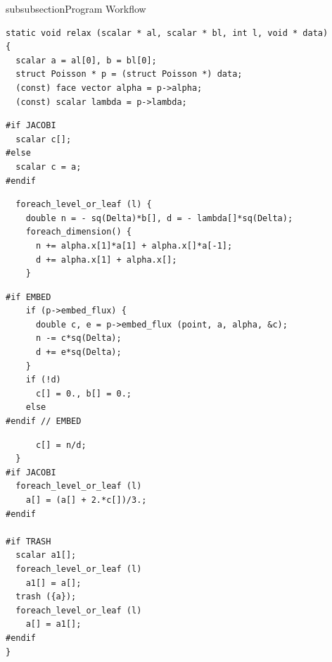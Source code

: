 \begin{codesection}{subsubsection}{Program Workflow}
\begin{verbatim}
static void relax (scalar * al, scalar * bl, int l, void * data)
{
  scalar a = al[0], b = bl[0];
  struct Poisson * p = (struct Poisson *) data;
  (const) face vector alpha = p->alpha;
  (const) scalar lambda = p->lambda;
\end{verbatim}
\codearrow
{}
\begin{verbatim}
#if JACOBI
  scalar c[];
#else
  scalar c = a;
#endif
\end{verbatim}
\codearrow
{}
\begin{verbatim}
  foreach_level_or_leaf (l) {
    double n = - sq(Delta)*b[], d = - lambda[]*sq(Delta);
    foreach_dimension() {
      n += alpha.x[1]*a[1] + alpha.x[]*a[-1];
      d += alpha.x[1] + alpha.x[];
    }
\end{verbatim}
\codearrow
{}
\begin{verbatim}
#if EMBED
    if (p->embed_flux) {
      double c, e = p->embed_flux (point, a, alpha, &c);
      n -= c*sq(Delta);
      d += e*sq(Delta);
    }
    if (!d)
      c[] = 0., b[] = 0.;
    else
#endif // EMBED
\end{verbatim}
\codearrow
{}
\begin{verbatim}
      c[] = n/d;
  }
#if JACOBI
  foreach_level_or_leaf (l)
    a[] = (a[] + 2.*c[])/3.;
#endif
  
#if TRASH
  scalar a1[];
  foreach_level_or_leaf (l)
    a1[] = a[];
  trash ({a});
  foreach_level_or_leaf (l)
    a[] = a1[];
#endif
}
\end{verbatim}
\end{codesection}


